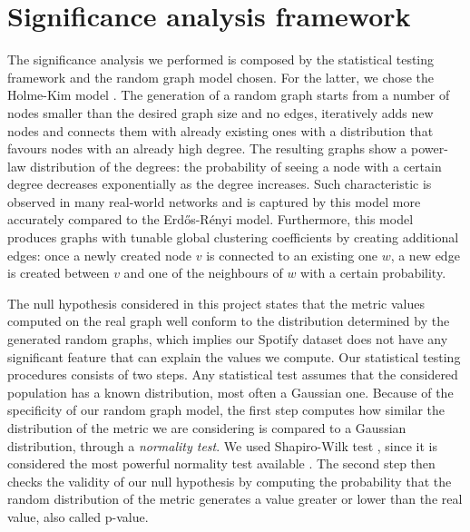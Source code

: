 \section{Significance analysis framework}

The significance analysis we performed is composed by the statistical testing framework and the random graph model chosen. For the latter, we chose the Holme-Kim model \cite{Holme2002}. The generation of a random graph starts from a number of nodes smaller than the desired graph size and no edges, iteratively adds new nodes and connects them with already existing ones with a distribution that favours nodes with an already high degree. The resulting graphs show a power-law distribution of the degrees: the probability of seeing a node with a certain degree decreases exponentially as the degree increases. Such characteristic is observed in many real-world networks and is captured by this model more accurately compared to the Erd\H{o}s-R\'{e}nyi model. Furthermore, this model produces graphs with tunable global clustering coefficients by creating additional edges: once a newly created node $v$ is connected to an existing one $w$, a new edge is created between $v$ and one of the neighbours of $w$ with a certain probability.

The null hypothesis considered in this project states that the metric values computed on the real graph well conform to the distribution determined by the generated random graphs, which implies our Spotify dataset does not have any significant feature that can explain the values we compute. Our statistical testing procedures consists of two steps. Any statistical test assumes that the considered population has a known distribution, most often a Gaussian one. Because of the specificity of our random graph model, the first step computes how similar the distribution of the metric we are considering is compared to a Gaussian distribution, through a \emph{normality test}. We used Shapiro-Wilk test \cite{ShapiroWilk1965}, since it is considered the most powerful normality test available \cite{RazaliYap2011}. The second step then checks the validity of our null hypothesis by computing the probability that the random distribution of the metric generates a value greater or lower than the real value, also called p-value.